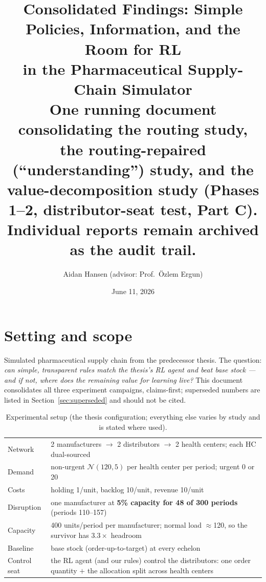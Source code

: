 \documentclass[11pt]{article}
\title{\textbf{Consolidated Findings: Simple Policies, Information, and the Room for RL\\
in the Pharmaceutical Supply-Chain Simulator}\\
\normalsize One running document consolidating the routing study, the routing-repaired
(``understanding'') study, and the value-decomposition study (Phases 1--2,
distributor-seat test, Part C). Individual reports remain archived as the audit trail.}
\author{Aidan Hansen \quad (advisor: Prof.\ \"Ozlem Ergun)}
\date{June 11, 2026}
\begin{document}
\maketitle

\section*{Setting and scope}

Simulated pharmaceutical supply chain from the predecessor thesis. The question:
\emph{can simple, transparent rules match the thesis's RL agent and beat base stock ---
and if not, where does the remaining value for learning live?} This document consolidates
all three experiment campaigns, claims-first; superseded numbers are listed in
Section~\ref{sec:superseded} and should not be cited.

\begin{table}[h]
\centering\small
\caption{Experimental setup (the thesis configuration; everything else varies by study
and is stated where used).}
\begin{tabular}{l p{11.6cm}}
\toprule
Network & 2 manufacturers $\to$ 2 distributors $\to$ 2 health centers; each HC
dual-sourced \\
Demand & non-urgent $\mathcal{N}(120, 5)$ per health center per period; urgent 0 or 20 \\
Costs & holding 1/unit, backlog 10/unit, revenue 10/unit \\
Disruption & one manufacturer at \textbf{5\% capacity for 48 of 300 periods}
(periods 110--157) \\
Capacity & 400 units/period per manufacturer; normal load $\approx$120, so the survivor
has $3.3\times$ headroom \\
Baseline & base stock (order-up-to-target) at every echelon \\
Control seat & the RL agent (and our rules) control the distributors: one order
quantity $+$ the allocation split across health centers \\
\bottomrule
\end{tabular}
\end{table}
\end{document}
